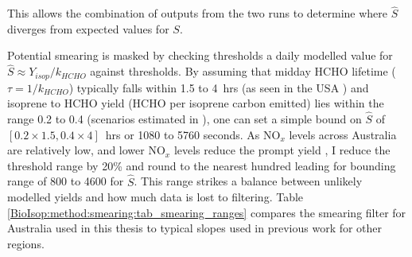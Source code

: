       This allows the combination of outputs from the two runs to determine where $\hat{S}$ diverges from expected values for $S$.
      
      Potential smearing is masked by checking thresholds a daily modelled value for $\hat{S} \approx Y_{isop}/k_{HCHO}$ against thresholds.
      By assuming that midday HCHO lifetime ($\tau = 1/k_{HCHO}$) typically falls within 1.5 to 4~hrs (as seen in the USA \parencite[e.g.][]{Palmer2006,Wolfe2016}) and isoprene to HCHO yield (HCHO per isoprene carbon emitted) lies within the range 0.2 to 0.4 (scenarios estimated in \textcite{Palmer2003}), one can set a simple bound on $\hat{S}$ of $[0.2 \times 1.5, 0.4 \times 4]$~hrs or 1080 to 5760 seconds.
      As NO$_x$ levels across Australia are relatively low, and lower NO$_x$ levels reduce the prompt yield \parencite{Palmer2003,Wolfe2016}, I reduce the threshold range by 20\% and round to the nearest hundred leading for bounding range of 800 to 4600 for $\hat{S}$. 
      This range strikes a balance between unlikely modelled yields and how much data is lost to filtering.
      Table \ref{BioIsop:method:smearing:tab_smearing_ranges} compares the smearing filter for Australia used in this thesis to typical slopes used in previous work for other regions.
      
